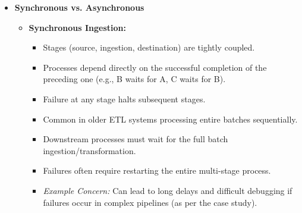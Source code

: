 \begin{itemize}
    Some key points regarding frequency:
    \begin{itemize}
        \item The term "Real-time"
        \footnote{
            The terms "real-time" and "streaming" are used
            interchangeably.
        }
        is often used for brevity but technically means
        "near real-time" because all systems have some inherent
        latency.
        \item  Ingestion frequencies vary widely based on use cases
        and technology.
        \item Companies often use a mix of batch and streaming
        ingestion.
        \item Even when ingestion is streaming, downstream processes
        (like ML) are often still done in batches.
        \item Data engineers must decide where batch boundaries will
        occur in the data lifecycle.
    \end{itemize}



    \item \textbf{Synchronous vs. Asynchronous}
    
    \noindent
    \begin{itemize}
        \item \textbf{Synchronous Ingestion:}
            \begin{itemize}%
                \item Stages (source, ingestion, destination) are tightly coupled.
                \item Processes depend directly on the successful completion of the preceding one (e.g., B waits for A, C waits for B).
                \item Failure at any stage halts subsequent stages.
                \item Common in older ETL systems processing entire batches sequentially.
                \item Downstream processes must wait for the full batch ingestion/transformation.
                \item Failures often require restarting the entire multi-stage process.
                \item \textit{Example Concern:} Can lead to long delays and difficult debugging if failures occur in complex pipelines (as per the case study).
            \end{itemize}
    

\end{itemize}
\end{itemize}
